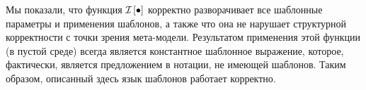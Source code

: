 Мы показали, что функция $\mathcal{I}_{} \left[ \bullet \right]$ корректно разворачивает все шаблонные параметры и применения шаблонов, а также что она не нарушает структурной корректности с точки зрения мета-модели. Результатом применения этой функции (в пустой среде) всегда является константное шаблонное выражение, которое, фактически, является предложением в нотации, не имеющей шаблонов. Таким образом, описанный здесь язык шаблонов работает корректно.

